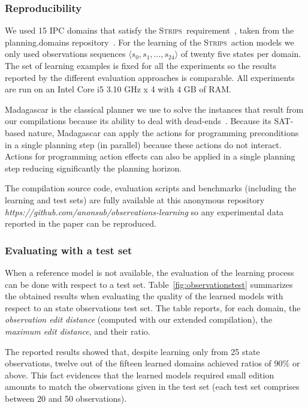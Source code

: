 \documentclass{article}
\newcommand{\tup}[1]{{\langle #1 \rangle}}
\newcommand{\strips}{\textsc{Strips}}     %
\begin{document}
\subsubsection{Reproducibility}
We used 15 IPC domains that satisfy the \strips\ requirement~\cite{fox2003pddl2}, taken from the {\sc planning.domains} repository~\cite{muise2016planning}. For the learning of the \strips\ action models we only used observations sequences $\tup{s_0, s_1, \ldots, s_{24}}$ of twenty five states per domain. The set of learning examples is fixed for all the experiments so the results reported by the different evaluation approaches is comparable. All experiments are run on an Intel Core i5 3.10 GHz x 4 with 4 GB of RAM.

{\sc Madagascar} is the classical planner we use to solve the instances that result from our compilations because its ability to deal with dead-ends~\cite{rintanen2014madagascar}. Because its SAT-based nature, {\sc Madagascar} can apply the actions for programming preconditions in a single planning step (in parallel) because these actions do not interact. Actions for programming action effects can also be applied in a single planning step reducing significantly the planning horizon.

The compilation source code, evaluation scripts and benchmarks (including the learning and test sets) are fully available at this anonymous repository {\em https://github.com/anonsub/observations-learning} so any experimental data reported in the paper can be reproduced.

\subsubsection{Evaluating with a test set}
When a reference model is not available, the evaluation of the learning process can be done with respect to a test set. Table~\ref{fig:observationstest} summarizes the obtained results when evaluating the quality of the learned models with respect to an state observations test set. The table reports, for each domain, the {\em observation edit distance} (computed with our extended compilation), the {\em maximum edit distance}, and their ratio.

The reported results showed that, despite learning only from 25 state observations, twelve out of the fifteen learned domains achieved ratios of $90\%$ or above. This fact evidences that the learned models required small edition amounts to match the observations given in the test set (each test set comprises between 20 and 50 observations).
\end{document}
